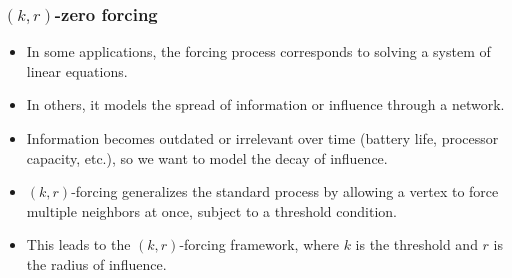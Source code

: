 \documentclass{beamer}
\theoremstyle{definition}
\begin{document}
\begin{frame}
  \frametitle{$(k,r)$-zero forcing}
\begin{itemize}
  \item In some applications, the forcing process corresponds to solving a system of linear equations.
  \item In others, it models the spread of information or influence through a network.
  \item Information becomes outdated or irrelevant over time (battery life, processor capacity, etc.), so we want to model the decay of influence.
  \item $(k,r)$-forcing generalizes the standard process by allowing a vertex to force multiple neighbors at once, subject to a threshold condition.
  \item This leads to the $(k,r)$-forcing framework, where $k$ is the threshold and $r$ is the radius of influence.
\end{itemize}

\end{frame}
\end{document}
